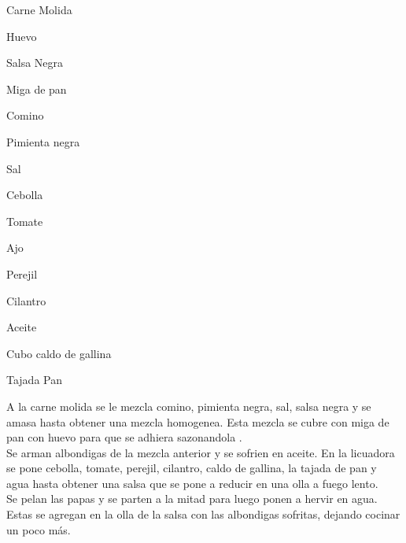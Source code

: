 

\begin{ingredientes}
\item Carne Molida
\item Huevo
\item Salsa Negra
\item Miga de pan
\item Comino
\item Pimienta negra
\item Sal
\item Cebolla
\item Tomate
\item Ajo
\item Perejil
\item Cilantro
\item Aceite
\item Cubo caldo de gallina
\item Tajada Pan
\end{ingredientes}
\preparacion
A la carne molida se le mezcla comino, pimienta negra, sal, salsa negra y se amasa hasta obtener una mezcla homogenea. Esta mezcla se cubre con miga de pan con huevo para que se adhiera sazonandola .\\

Se arman albondigas de la mezcla anterior  y se sofrien en aceite. En la licuadora se pone cebolla, tomate, perejil, cilantro, caldo de gallina, la tajada de pan y agua hasta obtener una salsa que se pone a reducir en una olla a fuego lento.\\

Se pelan las papas y se parten a la mitad para luego ponen a hervir en agua. Estas se agregan en la olla de la salsa con las albondigas sofritas, dejando cocinar un poco más.